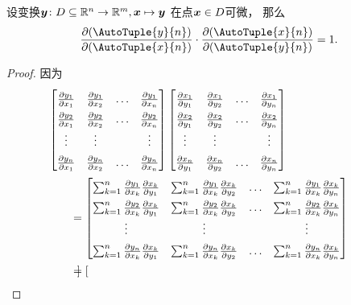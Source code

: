 \begin{proposition}
设变换\(\boldsymbol{y}\colon D\subseteq\mathbb{R}^n\to\mathbb{R}^m,\boldsymbol{x}\mapsto\boldsymbol{y}\)
在点\(\boldsymbol{x} \in D\)可微，
那么\[
	\jacobi{\AutoTuple{y}{n}}{\AutoTuple{x}{n}}
	\cdot
	\jacobi{\AutoTuple{x}{n}}{\AutoTuple{y}{n}}
	= 1.
\]
\begin{proof}
因为\begin{align*}
	&\hspace{-20pt}
	\begin{bmatrix}
		\pdv{y_1}{x_1} & \pdv{y_1}{x_2} & \dots & \pdv{y_1}{x_n} \\
		\pdv{y_2}{x_1} & \pdv{y_2}{x_2} & \dots & \pdv{y_2}{x_n} \\
		\vdots & \vdots & & \vdots \\
		\pdv{y_n}{x_1} & \pdv{y_n}{x_2} & \dots & \pdv{y_n}{x_n} \\
	\end{bmatrix}
	\begin{bmatrix}
		\pdv{x_1}{y_1} & \pdv{x_1}{y_2} & \dots & \pdv{x_1}{y_n} \\
		\pdv{x_2}{y_1} & \pdv{x_2}{y_2} & \dots & \pdv{x_2}{y_n} \\
		\vdots & \vdots & & \vdots \\
		\pdv{x_n}{y_1} & \pdv{x_n}{y_2} & \dots & \pdv{x_n}{y_n} \\
	\end{bmatrix} \\
	&= \begin{bmatrix}
		\sum_{k=1}^n \pdv{y_1}{x_k} \pdv{x_k}{y_1}
		& \sum_{k=1}^n \pdv{y_1}{x_k} \pdv{x_k}{y_2}
		& \dots
		& \sum_{k=1}^n \pdv{y_1}{x_k} \pdv{x_k}{y_n} \\
		\sum_{k=1}^n \pdv{y_2}{x_k} \pdv{x_k}{y_1}
		& \sum_{k=1}^n \pdv{y_2}{x_k} \pdv{x_k}{y_2}
		& \dots
		& \sum_{k=1}^n \pdv{y_2}{x_k} \pdv{x_k}{y_n} \\
		\vdots & \vdots & & \vdots \\
		\sum_{k=1}^n \pdv{y_n}{x_k} \pdv{x_k}{y_1}
		& \sum_{k=1}^n \pdv{y_n}{x_k} \pdv{x_k}{y_2}
		& \dots
		& \sum_{k=1}^n \pdv{y_n}{x_k} \pdv{x_k}{y_n} \\
	\end{bmatrix} \\
	&= {\def\arraystretch{1.5}
	\begin{bmatrix} %

\end{bmatrix}}
\end{align*}
\end{proof}
\end{proposition}

